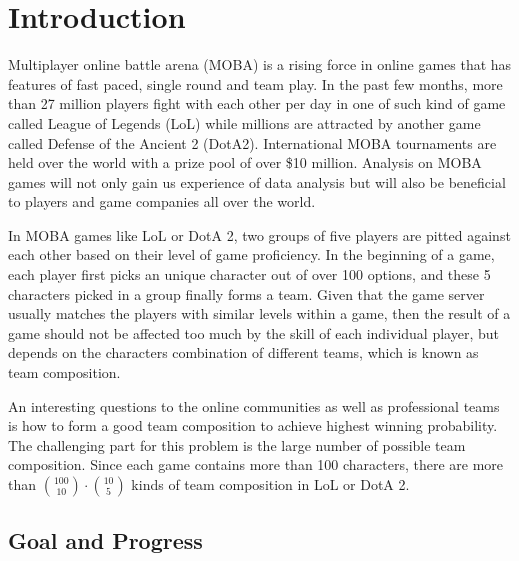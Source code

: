 \documentclass[conference]{IEEEtran}
\begin{document}




%



\section{Introduction}

Multiplayer online battle arena (MOBA) is a rising force in online games that has features of fast paced, single round and team play. In the past few months, more than 27 million players fight with each other per day in one of such kind of game called League of Legends (LoL)\cite{Ian} while millions are attracted by another game called Defense of the Ancient 2 (DotA2). International MOBA tournaments are held over the world with a prize pool of over \$10 million\cite{Valve}.  Analysis on MOBA games will not only gain us experience of data analysis but will also be beneficial to players and game companies all over the world.

In MOBA games like LoL or DotA 2, two groups of five players are pitted against each other based on their level of game proficiency. In the beginning of a game, each player first picks an unique character out of over 100 options, and these 5 characters picked in a group finally forms a team. Given that the game server usually matches the players with similar levels within a game, then the result of a game should not be affected too much by the skill of each individual player, but depends on the characters combination of different teams, which is known as team composition.

An interesting questions to the online communities as well as professional teams is how to form a good team composition to achieve highest winning probability. The challenging part for this problem is the large number of possible team composition. Since each game contains more than 100 characters, there are more than $\binom{100}{10}\cdot\binom{10}{5}$ kinds of team composition in LoL or DotA 2.


\subsection{Goal and Progress}
\end{document}
